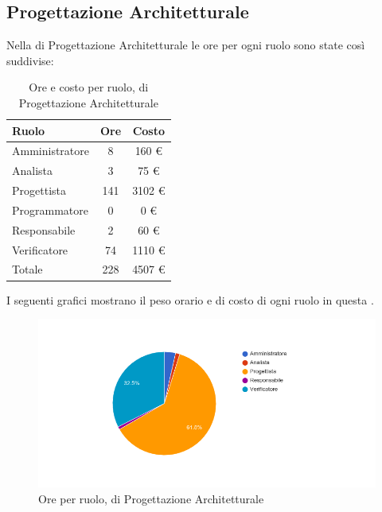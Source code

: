 \subsection{Progettazione Architetturale}
Nella  di Progettazione Architetturale le ore per ogni ruolo sono state cos\`i suddivise:

\begin{table}[H]
	\centering
	\begin{tabular}{ l c c }
		\textbf{Ruolo} & \textbf{Ore} & \textbf{Costo} \\
		\hline
		Amministratore & 8 & 160 \euro{} \\
		Analista & 3 & 75 \euro{} \\
		Progettista & 141 & 3102 \euro{} \\
		Programmatore & 0 & 0 \euro{} \\
		Responsabile & 2 & 60 \euro{} \\
		Verificatore & 74 & 1110 \euro{} \\
		\hline
		Totale & 228 & 4507 \euro{} \\
		\hline
	\end{tabular}
	\caption{Ore e costo per ruolo,  di Progettazione Architetturale}
\end{table}

I seguenti grafici mostrano il peso orario e di costo di ogni ruolo in questa .

\begin{figure}[H]
  \begin{center}
    \includegraphics[width=15cm]{res/img/prospettoEconomico/orePerRuoloProgettazioneArchitetturale.png}
  \caption{Ore per ruolo,  di Progettazione Architetturale}
  \end{center} 
\end{figure}  

